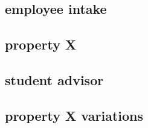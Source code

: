 \documentclass[10pt,a4paper]{article}
\begin{document}
\subsection{employee intake}


\subsection{property X}


\subsection{student advisor}


\subsection{property X variations}

\end{document}
